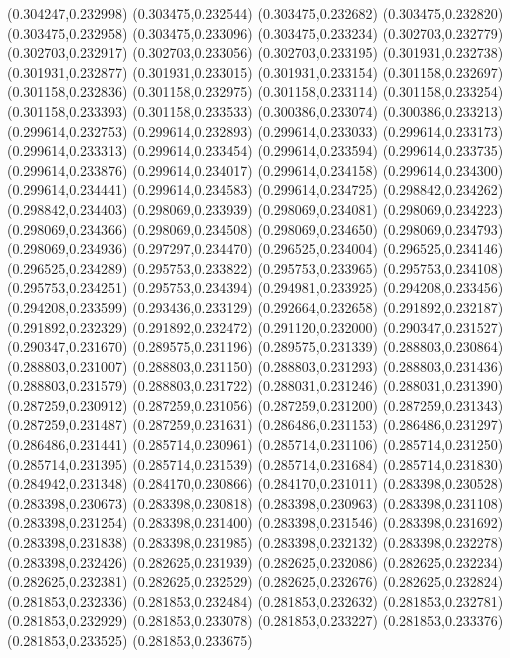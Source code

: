 (0.304247,0.232998)
(0.303475,0.232544)
(0.303475,0.232682)
(0.303475,0.232820)
(0.303475,0.232958)
(0.303475,0.233096)
(0.303475,0.233234)
(0.302703,0.232779)
(0.302703,0.232917)
(0.302703,0.233056)
(0.302703,0.233195)
(0.301931,0.232738)
(0.301931,0.232877)
(0.301931,0.233015)
(0.301931,0.233154)
(0.301158,0.232697)
(0.301158,0.232836)
(0.301158,0.232975)
(0.301158,0.233114)
(0.301158,0.233254)
(0.301158,0.233393)
(0.301158,0.233533)
(0.300386,0.233074)
(0.300386,0.233213)
(0.299614,0.232753)
(0.299614,0.232893)
(0.299614,0.233033)
(0.299614,0.233173)
(0.299614,0.233313)
(0.299614,0.233454)
(0.299614,0.233594)
(0.299614,0.233735)
(0.299614,0.233876)
(0.299614,0.234017)
(0.299614,0.234158)
(0.299614,0.234300)
(0.299614,0.234441)
(0.299614,0.234583)
(0.299614,0.234725)
(0.298842,0.234262)
(0.298842,0.234403)
(0.298069,0.233939)
(0.298069,0.234081)
(0.298069,0.234223)
(0.298069,0.234366)
(0.298069,0.234508)
(0.298069,0.234650)
(0.298069,0.234793)
(0.298069,0.234936)
(0.297297,0.234470)
(0.296525,0.234004)
(0.296525,0.234146)
(0.296525,0.234289)
(0.295753,0.233822)
(0.295753,0.233965)
(0.295753,0.234108)
(0.295753,0.234251)
(0.295753,0.234394)
(0.294981,0.233925)
(0.294208,0.233456)
(0.294208,0.233599)
(0.293436,0.233129)
(0.292664,0.232658)
(0.291892,0.232187)
(0.291892,0.232329)
(0.291892,0.232472)
(0.291120,0.232000)
(0.290347,0.231527)
(0.290347,0.231670)
(0.289575,0.231196)
(0.289575,0.231339)
(0.288803,0.230864)
(0.288803,0.231007)
(0.288803,0.231150)
(0.288803,0.231293)
(0.288803,0.231436)
(0.288803,0.231579)
(0.288803,0.231722)
(0.288031,0.231246)
(0.288031,0.231390)
(0.287259,0.230912)
(0.287259,0.231056)
(0.287259,0.231200)
(0.287259,0.231343)
(0.287259,0.231487)
(0.287259,0.231631)
(0.286486,0.231153)
(0.286486,0.231297)
(0.286486,0.231441)
(0.285714,0.230961)
(0.285714,0.231106)
(0.285714,0.231250)
(0.285714,0.231395)
(0.285714,0.231539)
(0.285714,0.231684)
(0.285714,0.231830)
(0.284942,0.231348)
(0.284170,0.230866)
(0.284170,0.231011)
(0.283398,0.230528)
(0.283398,0.230673)
(0.283398,0.230818)
(0.283398,0.230963)
(0.283398,0.231108)
(0.283398,0.231254)
(0.283398,0.231400)
(0.283398,0.231546)
(0.283398,0.231692)
(0.283398,0.231838)
(0.283398,0.231985)
(0.283398,0.232132)
(0.283398,0.232278)
(0.283398,0.232426)
(0.282625,0.231939)
(0.282625,0.232086)
(0.282625,0.232234)
(0.282625,0.232381)
(0.282625,0.232529)
(0.282625,0.232676)
(0.282625,0.232824)
(0.281853,0.232336)
(0.281853,0.232484)
(0.281853,0.232632)
(0.281853,0.232781)
(0.281853,0.232929)
(0.281853,0.233078)
(0.281853,0.233227)
(0.281853,0.233376)
(0.281853,0.233525)
(0.281853,0.233675)
